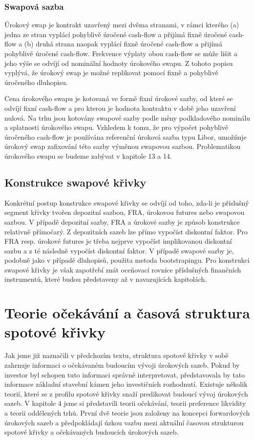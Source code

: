 \documentclass[a4paper]{book}
\begin{document}
\subsubsection{Swapová sazba}

Úrokový swap je kontrakt uzavřený mezi dvěma stranami, v rámci kterého (a) jedna ze stran vyplácí pohyblivě úročené cash-flow a přijímá fixně úročené cash-flow a (b) druhá strana naopak vyplácí fixně úročené cash-flow a přijímá pohyblivě úročené cash-flow. Frekvence výplaty obou cash-flow se může lišit a jeho výše se odvíjí od nominální hodnoty úrokového swapu. Z tohoto popisu vyplývá, že úrokový swap je možné replikovat pomocí fixně a pohyblivě úročeného dluhopisu.

Cena úrokového swapu je kotovaná ve formě fixní úrokové sazby, od které se odvíjí fixní cash-flow a pro kterou je hodnota kontraktu v době jeho uzavření nulová. Na trhu jsou kotovány swapové sazby podle měny podkladového nominálu a splatnosti úrokového swapu. Vzhledem k tomu, že pro výpočet pohyblivě úročeného cash-flow je používána referenční úroková sazba typu Libor, umožňuje úrokový swap zafixování této sazby výměnou swapovou sazbou. Problematikou úrokového swapu se budeme zabývat v kapitole 13 a 14.

\subsection{Konstrukce swapové křivky}

Konkrétní postup konstrukce swapové křivky se odvíjí od toho, zda-li je příslušný segment křivky tvořen depozitní sazbou, FRA, úrokovou futures nebo swapovou sazbou. V případě depozitní sazby, FRA a úrokové sazby je způsob konstrukce relativně přímočarý. Z depozitních sazeb lze přímo vypočíst diskontní faktor. Pro FRA resp. úrokové futures je třeba nejprve vypočíst implikovanou diskontní sazbu a z té následně vypočíst diskontní faktor. V případě swapové sazby je, podobně jako v případě dluhopisů, použita metoda bootstrapingu. Pro konstrukci swapové křivky je však zapotřebí znát oceňovací rovnice příslušných finančních instrumentů, které budou představeny až v navazujících kapitolách.

\section{Teorie očekávání a časová struktura spotové křivky}

Jak jsme již naznačili v předchozím textu, struktura spotové křivky v sobě zahrnuje informaci o očekávaném budoucím vývoji úrokových sazeb. Pokud by investor byl schopen tuto informaci správně interpretovat, představovala by tato informace základní stavební kámen jeho investičních rozhodnutí. Existuje několik teorií, které se z profilu spotové křivky snaží predikovat budoucí vývoj úrokových sazeb. V kapitole 4 jsme si představili teorii očekávání, teorii preference likvidity a teorii oddělených trhů. První dvě teorie jsou založeny na koncepci forwardových úrokových sazeb a předpokládají úzkou vazbu mezi aktuální časovou strukturou spotové křivky a očekávaných budoucích úrokových sazeb.
\end{document}
